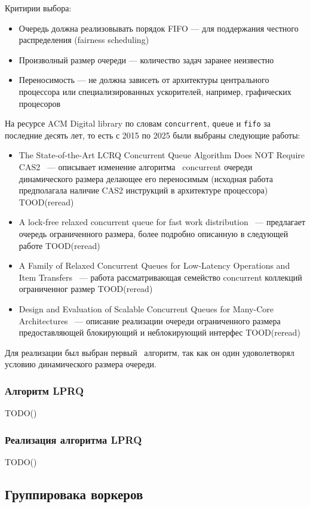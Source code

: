 Критирии выбора:

\begin{itemize}
    \item Очередь должна реализовывать порядок FIFO --- для поддержания честного распределения (fairness scheduling)
    \item Произволный размер очереди --- количество задач заранее неизвестно
    \item Переносимость --- не должна зависеть от архитектуры центрального процессора или специализированных ускорителей, например, графических процесоров
\end{itemize}

На ресурсе ACM Digital library по словам \verb|concurrent|, \verb|queue| и \verb|fifo| за последние десять лет, то есть с 2015 по 2025 были выбраны следующие работы:

\begin{itemize}
    \item The State-of-the-Art LCRQ Concurrent Queue Algorithm Does NOT Require CAS2~\cite{LCRQNoCAS2} --- описывает изменение алгоритма~\cite{FastConcurrentQueuesX86} concurrent очереди динамического размера делающее его переносимым (исходная работа предполагала наличие CAS2 инструкций в архитектуре процессора) TOOD(reread)
    \item A lock-free relaxed concurrent queue for fast work distribution~\cite{FastWorkDistribution} --- предлагает очередь ограниченного размера, более подробно описанную в следующей работе TOOD(reread)
    \item A Family of Relaxed Concurrent Queues for Low-Latency Operations and Item Transfers~\cite{FamilyRelaxedConcurrentQueues} --- работа рассматривающая семейство concurrent коллекций ограниченног размер TOOD(reread)
    \item Design and Evaluation of Scalable Concurrent Queues for Many-Core Architectures~\cite{ScalableConcurrentQueuesManyCoreArchitectures}  --- описание реализации очереди ограниченного размера предоставляющей блокирующий и неблокирующий интерфес TOOD(reread)
\end{itemize}

Для реализации был выбран первый~\cite{LCRQNoCAS2} алгоритм, так как он один удоволетворял условию динамического размера очереди.

\subsubsection{Алгоритм LPRQ}

TODO()

\subsubsection{Реализация алгоритма LPRQ}

TODO()

\subsection{Группировака воркеров}
